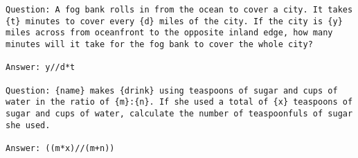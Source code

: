 



\begin{lstlisting}[style=myGrammarStyle, caption=Problem Solution Examples for GSM-Symbolic]
Question: A fog bank rolls in from the ocean to cover a city. It takes {t} minutes to cover every {d} miles of the city. If the city is {y} miles across from oceanfront to the opposite inland edge, how many minutes will it take for the fog bank to cover the whole city?

Answer: y//d*t

Question: {name} makes {drink} using teaspoons of sugar and cups of water in the ratio of {m}:{n}. If she used a total of {x} teaspoons of sugar and cups of water, calculate the number of teaspoonfuls of sugar she used.

Answer: ((m*x)//(m+n))
\end{lstlisting}
\label{gram:gsm_example}